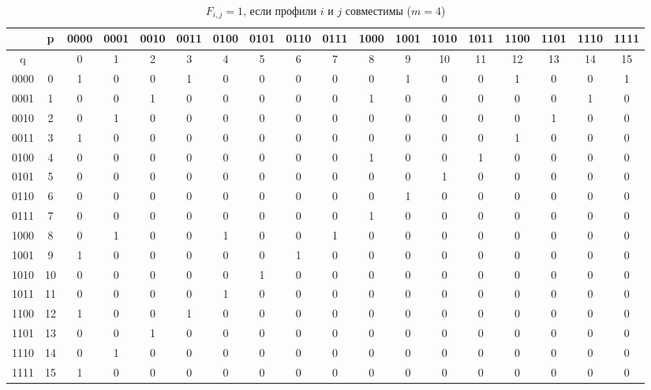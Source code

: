 \begin{enumerate}
\begin{table}[ht]
  \tiny
\caption{$F_{i,j}=1$, если профили $i$ и $j$ совместимы  ($m=4$)}
\label{tab02}
\begin{tabular}{*{18}{|c}|}
\hline
\centering
  & p & {0000} & {0001} & {0010} & {0011} & {0100} & {0101} & {0110} & {0111} & {1000} & {1001} & {1010} & {1011} & {1100} & {1101} & {1110} & {1111} \\
\hline
q &  & 0 & 1 & 2 & 3 & 4 & 5 & 6 & 7 & 8 & 9 & 10 & 11 & 12 & 13 & 14 & 15 \\
\hline
{0000} & 0 & 1 & 0 & 0 & 1 & 0 & 0 & 0 & 0 & 0 & 1 & 0 & 0 & 1 & 0 & 0 & 1 \\
\hline
{0001} & 1 & 0 & 0 & 1 & 0 & 0 & 0 & 0 & 0 & 1 & 0 & 0 & 0 & 0 & 0 & 1 & 0 \\
\hline
{0010} & 2 & 0 & 1 & 0 & 0 & 0 & 0 & 0 & 0 & 0 & 0 & 0 & 0 & 0 & 1 & 0 & 0 \\
\hline
{0011} & 3 & 1 & 0 & 0 & 0 & 0 & 0 & 0 & 0 & 0 & 0 & 0 & 0 & 1 & 0 & 0 & 0 \\
\hline
{0100} & 4 & 0 & 0 & 0 & 0 & 0 & 0 & 0 & 0 & 1 & 0 & 0 & 1 & 0 & 0 & 0 & 0 \\
\hline
{0101} & 5 & 0 & 0 & 0 & 0 & 0 & 0 & 0 & 0 & 0 & 0 & 1 & 0 & 0 & 0 & 0 & 0 \\
\hline
{0110} & 6 & 0 & 0 & 0 & 0 & 0 & 0 & 0 & 0 & 0 & 1 & 0 & 0 & 0 & 0 & 0 & 0 \\
\hline
{0111} & 7 & 0 & 0 & 0 & 0 & 0 & 0 & 0 & 0 & 1 & 0 & 0 & 0 & 0 & 0 & 0 & 0 \\
\hline
{1000} & 8 & 0 & 1 & 0 & 0 & 1 & 0 & 0 & 1 & 0 & 0 & 0 & 0 & 0 & 0 & 0 & 0 \\
\hline
{1001} & 9 & 1 & 0 & 0 & 0 & 0 & 0 & 1 & 0 & 0 & 0 & 0 & 0 & 0 & 0 & 0 & 0 \\
\hline
{1010} & 10 & 0 & 0 & 0 & 0 & 0 & 1 & 0 & 0 & 0 & 0 & 0 & 0 & 0 & 0 & 0 & 0 \\
\hline
{1011} & 11 & 0 & 0 & 0 & 0 & 1 & 0 & 0 & 0 & 0 & 0 & 0 & 0 & 0 & 0 & 0 & 0 \\
\hline
{1100} & 12 & 1 & 0 & 0 & 1 & 0 & 0 & 0 & 0 & 0 & 0 & 0 & 0 & 0 & 0 & 0 & 0 \\
\hline
{1101} & 13 & 0 & 0 & 1 & 0 & 0 & 0 & 0 & 0 & 0 & 0 & 0 & 0 & 0 & 0 & 0 & 0 \\
\hline
{1110} & 14 & 0 & 1 & 0 & 0 & 0 & 0 & 0 & 0 & 0 & 0 & 0 & 0 & 0 & 0 & 0 & 0 \\
\hline
{1111} & 15 & 1 & 0 & 0 & 0 & 0 & 0 & 0 & 0 & 0 & 0 & 0 & 0 & 0 & 0 & 0 & 0 \\
\hline 
\end{tabular}
\end{table}


\end{enumerate}
